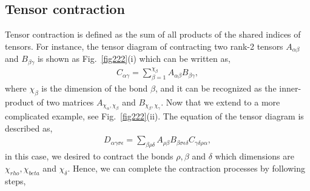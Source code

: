 
%


\subsection{Tensor contraction}

Tensor contraction is defined as the sum of all products of the shared indices of tensors. For instance, the tensor diagram of contracting two rank-2 tensors $A_{\alpha \beta}$ and $B_{\beta \gamma}$ is shown as Fig.~\ref{fig222}(i) which can be written as, 
\begin{align}
	C_{\alpha \gamma}=\sum\limits_{\beta = 1}^{\chi_{\beta}}{A_{\alpha \beta}B_{\beta \gamma}},
\end{align}
where $\chi_{\beta}$ is the dimension of the bond $\beta$, and it can be recognized as the inner-product of two matrices $A_{\chi_{\alpha}, \chi_{\beta}}$ and $B_{\chi_{\beta}, \chi_{\gamma}}$. Now that we extend to a more complicated example, see Fig.~\ref{fig222}(ii). The equation of the tensor diagram is described as,
\begin{align}
	D_{\alpha \gamma \sigma \epsilon}=\sum_{\beta \rho \delta}{A_{\rho \beta}B_{\beta \sigma \epsilon \delta}C_{\gamma \delta \rho \alpha}},
\end{align}
in this case, we desired to contract the bonds $\rho,\beta$ and $\delta$ which dimensions are $\chi_{rho}, \chi_{beta}$ and $\chi_{\delta}$. Hence, we can complete the contraction processes by following steps,

